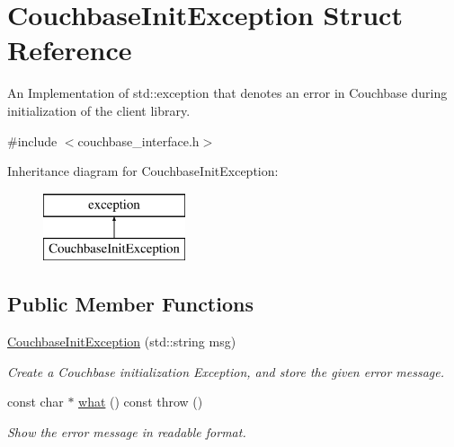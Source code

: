 \hypertarget{structCouchbaseInitException}{\section{Couchbase\-Init\-Exception Struct Reference}
\label{structCouchbaseInitException}
}


An Implementation of std\-::exception that denotes an error in Couchbase during initialization of the client library.  




{\ttfamily \#include $<$couchbase\-\_\-interface.\-h$>$}

Inheritance diagram for Couchbase\-Init\-Exception\-:\begin{figure}[H]
\begin{center}
\leavevmode
\includegraphics[height=2.000000cm]{structCouchbaseInitException}
\end{center}
\end{figure}
\subsection*{Public Member Functions}
\begin{DoxyCompactItemize}
\item 
\hypertarget{structCouchbaseInitException_af820c10eb0b8bcd3db5c19a1047a89f4}{\hyperlink{structCouchbaseInitException_af820c10eb0b8bcd3db5c19a1047a89f4}{Couchbase\-Init\-Exception} (std\-::string msg)}\label{structCouchbaseInitException_af820c10eb0b8bcd3db5c19a1047a89f4}

\begin{DoxyCompactList}\small\item\em Create a Couchbase initialization Exception, and store the given error message. \end{DoxyCompactList}\item 
\hypertarget{structCouchbaseInitException_a686ccc44a4ca9aad88a3f14005443b87}{const char $\ast$ \hyperlink{structCouchbaseInitException_a686ccc44a4ca9aad88a3f14005443b87}{what} () const   throw ()}\label{structCouchbaseInitException_a686ccc44a4ca9aad88a3f14005443b87}

\begin{DoxyCompactList}\small\item\em Show the error message in readable format. \end{DoxyCompactList}\end{DoxyCompactItemize}
